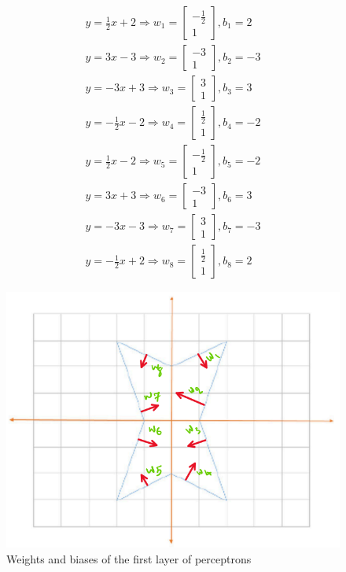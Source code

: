 \documentclass[en]{university}
\begin{document}
\begin{gather*}
    y = \frac{1}{2} x + 2 \Rightarrow w_1 = \begin{bmatrix}-\frac{1}{2} \\ 1\end{bmatrix}, b_1 = 2 \\
    y = 3 x - 3 \Rightarrow w_2 = \begin{bmatrix}-3 \\ 1\end{bmatrix}, b_2 = -3 \\
    y = - 3 x + 3 \Rightarrow w_3 = \begin{bmatrix}3 \\ 1\end{bmatrix}, b_3 = 3 \\
    y = - \frac{1}{2} x - 2 \Rightarrow w_4 = \begin{bmatrix}\frac{1}{2} \\ 1\end{bmatrix}, b_4 = -2 \\
    y = \frac{1}{2} x - 2 \Rightarrow w_5 = \begin{bmatrix}-\frac{1}{2} \\ 1\end{bmatrix}, b_5 = -2 \\
    y = 3 x + 3 \Rightarrow w_6 = \begin{bmatrix}-3 \\ 1\end{bmatrix}, b_6 = 3 \\
    y = -3 x - 3 \Rightarrow w_7 = \begin{bmatrix}3 \\ 1\end{bmatrix}, b_7 = -3 \\
    y = - \frac{1}{2} x + 2 \Rightarrow w_8 = \begin{bmatrix}\frac{1}{2} \\ 1\end{bmatrix}, b_8 = 2
\end{gather*}

\begin{figure}[!htbp]
\centering
\includegraphics[width=1\textwidth]{assets/3w.png}
\caption{Weights and biases of the first layer of perceptrons}
\label{fig:w}
\end{figure}
\end{document}
